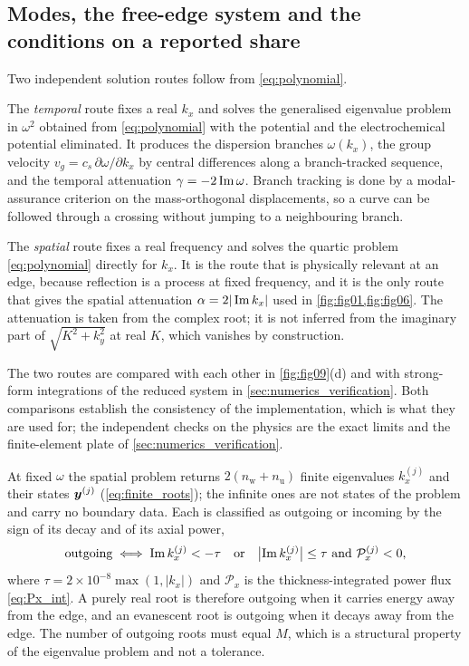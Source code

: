 \subsection{Modes, the free-edge system and the conditions on a reported share}
\label{sec:numerics_routes}
\label{sec:numerics_edge}
\label{sec:numerics_admissibility}

Two independent solution routes follow from \eqref{eq:polynomial}.

The \emph{temporal} route fixes a real $k_x$ and solves the generalised
eigenvalue problem in $\omega^2$ obtained from \eqref{eq:polynomial} with the
potential and the electrochemical potential eliminated.  It produces the
dispersion branches $\omega(k_x)$, the group velocity
$v_g=c_s\,\partial\omega/\partial k_x$ by central differences along a
branch-tracked sequence, and the temporal attenuation
$\gamma=-2\operatorname{Im}\omega$.  Branch tracking is done by a modal-assurance
criterion on the mass-orthogonal displacements, so a curve can be followed
through a crossing without jumping to a neighbouring branch.

The \emph{spatial} route fixes a real frequency and solves the quartic problem
\eqref{eq:polynomial} directly for $k_x$.  It is the route that is physically
relevant at an edge, because reflection is a process at fixed frequency, and it
is the only route that gives the spatial attenuation
$\alpha=2|\operatorname{Im} k_x|$ used in \cref{fig:fig01,fig:fig06}.  The attenuation is
taken from the complex root; it is not inferred from the imaginary part of
$\sqrt{K^2+k_y^2}$ at real $K$, which vanishes by construction.

The two routes are compared with each other in \cref{fig:fig09}(d) and with
strong-form integrations of the reduced system in
\cref{sec:numerics_verification}.  Both comparisons establish the consistency of
the implementation, which is what they are used for; the independent checks on
the physics are the exact limits and the finite-element plate of
\cref{sec:numerics_verification}.


At fixed $\omega$ the spatial problem returns $2(n_{\mathrm{w}}+n_{\mathrm u})$
finite eigenvalues $k_x^{(j)}$ and their states $\boldsymbol{y}^{(j)}$
(\eqref{eq:finite_roots}); the infinite ones are not states of the problem and
carry no boundary data.  Each is classified as outgoing or incoming by the sign
of its decay and of its axial power,
\begin{equation}
\label{eq:classification}
\text{outgoing}\iff
\operatorname{Im} k_x^{(j)}<-\tau
\quad\text{or}\quad
\bigl|\operatorname{Im} k_x^{(j)}\bigr|\le\tau\ \text{and}\ \mathcal{P}_x^{(j)}<0 ,
\end{equation}
where $\tau=2\times10^{-8}\max(1,|k_x|)$ and $\mathcal{P}_x$ is the
thickness-integrated power flux \eqref{eq:Px_int}.  A purely real root is
therefore outgoing when it carries energy away from the edge, and an
evanescent root is outgoing when it decays away from the edge.  The number of
outgoing roots must equal $M$, which is a structural property of the
eigenvalue problem and not a tolerance.

